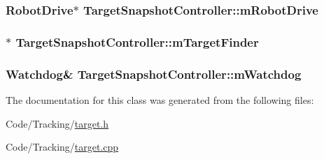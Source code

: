 \hypertarget{class_target_snapshot_controller_a0da2fc7476e28875120c9ece11c07521}{
\subsubsection[{m\-Robot\-Drive}]{\setlength{\rightskip}{0pt plus 5cm}\-Robot\-Drive$\ast$ {\bf \-Target\-Snapshot\-Controller\-::m\-Robot\-Drive}}}\label{class_target_snapshot_controller_a0da2fc7476e28875120c9ece11c07521}
\hypertarget{class_target_snapshot_controller_a743fe9d49f5c6e2305da1aa9b962fc5d}{
\subsubsection[{m\-Target\-Finder}]{$\ast$ {\bf \-Target\-Snapshot\-Controller\-::m\-Target\-Finder}}}\label{class_target_snapshot_controller_a743fe9d49f5c6e2305da1aa9b962fc5d}
\hypertarget{class_target_snapshot_controller_a9cb414dfbf515a98ddf6585a909d2cc3}{
\subsubsection[{m\-Watchdog}]{\setlength{\rightskip}{0pt plus 5cm}\-Watchdog\& {\bf \-Target\-Snapshot\-Controller\-::m\-Watchdog}}}\label{class_target_snapshot_controller_a9cb414dfbf515a98ddf6585a909d2cc3}


\-The documentation for this class was generated from the following files\-:\begin{DoxyCompactItemize}
\item 
\-Code/\-Tracking/\hyperlink{target_8h}{target.\-h}\item 
\-Code/\-Tracking/\hyperlink{target_8cpp}{target.\-cpp}\end{DoxyCompactItemize}
